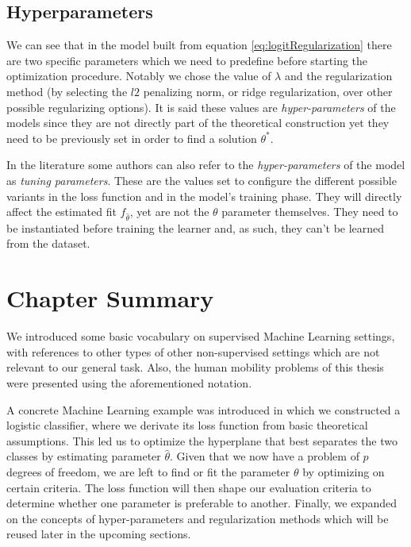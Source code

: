 \subsection{Hyperparameters}

We can see that in the model built from equation \cref{eq:logitRegularization} there are two specific parameters which we need to predefine before starting the optimization procedure.
Notably we chose the value of $\lambda$ and the regularization method (by selecting the $l2$ penalizing norm, or ridge regularization, over other possible regularizing options).
It is said these values are \textit{hyper-parameters} of the models since they are not directly part of the theoretical construction yet they need to be previously set in order to find a solution $\theta^\ast$.

In the literature some authors can also refer to the \textit{hyper-parameters} of the model as \textit{tuning parameters}.
These are the values set to configure the different possible variants in the loss function and in the model's training phase.
They will directly affect the estimated fit $f_{\hat{\theta}}$, yet are not the $\theta$ parameter themselves.
They need to be instantiated before training the learner and, as such, they can't be learned from the dataset.




\section{Chapter Summary}\label{section-ch_machine_learning_summary}

We introduced some basic vocabulary on supervised Machine Learning settings, with references to other types of other non-supervised settings which are not relevant to our general task.
Also, the human mobility problems of this thesis were presented using the aforementioned notation.

A concrete Machine Learning example was introduced in which we constructed a logistic classifier, where we derivate its loss function from basic theoretical assumptions.
This led us to optimize the hyperplane that best separates the two classes by estimating parameter $\hat{\theta}$.
Given that we now have a problem of $p$ degrees of freedom, we are left to find or fit the parameter $\theta$ by optimizing on certain criteria.
The loss function will then shape our evaluation criteria to determine whether one parameter is preferable to another.
Finally, we expanded on the concepts of hyper-parameters and regularization methods which will be reused later in the upcoming sections.


